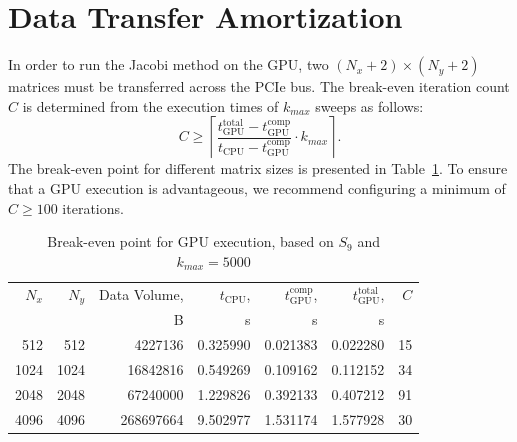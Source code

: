 \section{Data Transfer Amortization}
In order to run the Jacobi method on the GPU, two $(N_x + 2) \times (N_y + 2)$ matrices must be transferred across the PCIe bus. 
The break-even iteration count $C$ is determined from the execution times of $k_{max}$ sweeps as follows:
\begin{equation}
C \geq \left\lceil \frac{t_{\text{GPU}}^{\text{total}} - t_{\text{GPU}}^{\text{comp}}}{t_{\text{CPU}} - t_{\text{GPU}}^{\text{comp}}} \cdot k_{max} \right\rceil .
\end{equation}
The break-even point for different matrix sizes is presented in Table~\ref{tab:breakeven}. 
To ensure that a GPU execution is advantageous, we recommend configuring a minimum of $C \geq 100$ iterations. 

\begin{table}[h]
\centering
\begin{tabular}{rrrrrrr}
\hline
$N_x$ & $N_y$ & Data Volume, & $t_{\text{CPU}}$, & $t_{\text{GPU}}^{\text{comp}}$, & $t_{\text{GPU}}^{\text{total}}$, & $C$ \\
 & & B & s & s & s &  \\
\hline
512 & 512 & 4227136 & 0.325990 & 0.021383 & 0.022280 & 15 \\
1024 & 1024 & 16842816 & 0.549269 & 0.109162 & 0.112152 & 34 \\
2048 & 2048 & 67240000 & 1.229826 & 0.392133 & 0.407212 & 91 \\
4096 & 4096 & 268697664 & 9.502977 & 1.531174 & 1.577928 & 30 \\
\hline
\end{tabular}
\caption{Break-even point for GPU execution, based on $S_9$ and $k_{max} = 5000$}
\label{tab:breakeven} 
\end{table}


